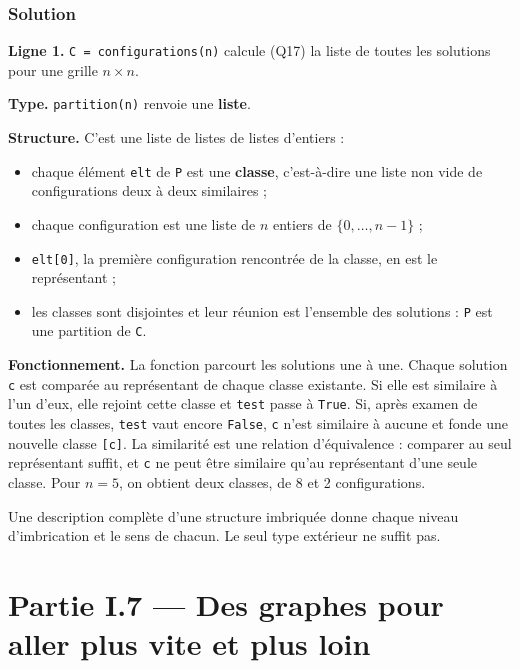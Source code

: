 \documentclass[11pt,a4paper]{article}
\providecommand{\tightlist}{\setlength{\itemsep}{0pt}\setlength{\parskip}{0pt}}
\begin{document}
\hypertarget{solution-20}{%
\subsubsection{Solution}\label{solution-20}}

\textbf{Ligne 1.} \texttt{C\ =\allowbreak{}\ configurations(\allowbreak{}n)\allowbreak{}} calcule (Q17) la liste de toutes les solutions pour une grille \(n \times n\).

\textbf{Type.} \texttt{partition(n)} renvoie une \textbf{liste}.

\textbf{Structure.} C'est une liste de listes de listes d'entiers :

\begin{itemize}
\tightlist
\item
  chaque élément \texttt{elt} de \texttt{P} est une \textbf{classe}, c'est-à-dire une liste non vide de configurations deux à deux similaires ;
\item
  chaque configuration est une liste de \(n\) entiers de \(\{0, \dots, n-1\}\) ;
\item
  \texttt{elt{[}0{]}}, la première configuration rencontrée de la classe, en est le représentant ;
\item
  les classes sont disjointes et leur réunion est l'ensemble des solutions : \texttt{P} est une partition de \texttt{C}.
\end{itemize}

\textbf{Fonctionnement.} La fonction parcourt les solutions une à une. Chaque solution \texttt{c} est comparée au représentant de chaque classe existante. Si elle est similaire à l'un d'eux, elle rejoint cette classe et \texttt{test} passe à \texttt{True}. Si, après examen de toutes les classes, \texttt{test} vaut encore \texttt{False}, \texttt{c} n'est similaire à aucune et fonde une nouvelle classe \texttt{{[}c{]}}. La similarité est une relation d'équivalence : comparer au seul représentant suffit, et \texttt{c} ne peut être similaire qu'au représentant d'une seule classe. Pour \(n = 5\), on obtient deux classes, de 8 et 2 configurations.

\begin{jury}

Une description complète d'une structure imbriquée donne chaque niveau d'imbrication et le sens de chacun. Le seul type extérieur ne suffit pas.

\end{jury}

\hypertarget{partie-i.7-des-graphes-pour-aller-plus-vite-et-plus-loin}{%
\section{Partie I.7 --- Des graphes pour aller plus vite et plus loin}\label{partie-i.7-des-graphes-pour-aller-plus-vite-et-plus-loin}}
\end{document}
